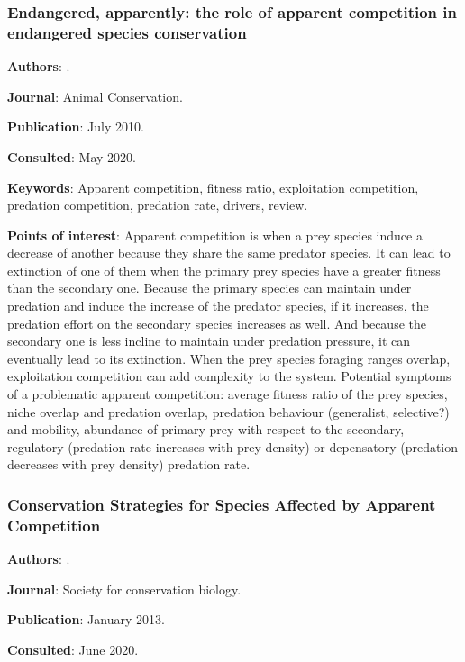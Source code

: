 \documentclass[12pt,a4paper]{article}
\begin{document}
\newpage 

\subsubsection*{Endangered, apparently: the role of apparent competition in endangered species conservation}

\textbf{Authors}: \cite{decesare2010endangered}.

\textbf{Journal}: Animal Conservation.

\textbf{Publication}: July 2010.

\textbf{Consulted}: May 2020.

\textbf{Keywords}: Apparent competition, fitness ratio, exploitation competition, predation competition, predation rate, drivers, review.

\textbf{Points of interest}: Apparent competition is when a prey species induce a decrease of another because they share the same predator species. It can lead to extinction of one of them when the primary prey species have a greater fitness than the secondary one. Because the primary species can maintain under predation and induce the increase of the predator species, if it increases, the predation effort on the secondary species increases as well. And because the secondary one is less incline to maintain under predation pressure, it can eventually lead to its extinction. When the prey species foraging ranges overlap, exploitation competition can add complexity to the system. Potential symptoms of a problematic apparent competition: average fitness ratio of the prey species, niche overlap and predation overlap, predation behaviour (generalist, selective?) and mobility, abundance of primary prey with respect to the secondary, regulatory (predation rate increases with prey density) or depensatory (predation decreases with prey density) predation rate.

\newpage

\subsubsection*{Conservation Strategies for Species Affected by Apparent Competition}

\textbf{Authors}: \cite{wittmer2012conservation}.

\textbf{Journal}: Society for conservation biology.

\textbf{Publication}: January 2013.

\textbf{Consulted}: June 2020.
\end{document}
